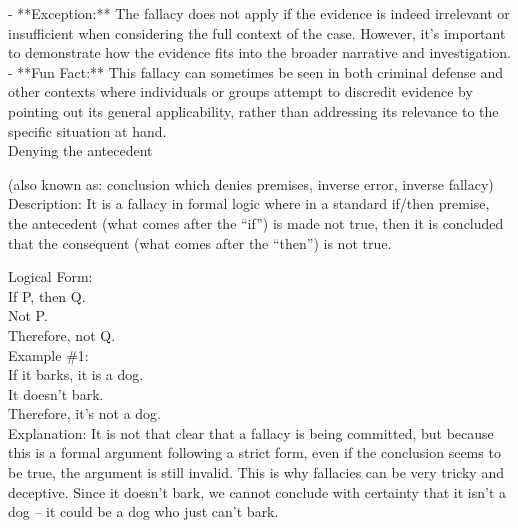 \documentclass[a4paper,12pt,single,pdftex]{scrbook}
\begin{document}
    
      - **Exception:** The fallacy does not apply if the evidence is indeed irrelevant or insufficient when considering the full context of the case. However, it’s important to demonstrate how the evidence fits into the broader narrative and investigation.
    \\

    
      - **Fun Fact:** This fallacy can sometimes be seen in both criminal defense and other contexts where individuals or groups attempt to discredit evidence by pointing out its general applicability, rather than addressing its relevance to the specific situation at hand.
    \\

  

Denying the antecedent
    
      (also known as: conclusion which denies premises, inverse error, inverse fallacy)
    \\

  
    Description: It is a fallacy in formal logic where in a standard if/then premise, the antecedent (what comes after the “if”) is made not true, then it is concluded that the consequent (what comes after the “then”) is not true.

    
      Logical Form:
    \\

    
      If P, then Q.
    \\

    
      Not P.
    \\

    
      Therefore, not Q.
    \\

    
      Example \#1:
    \\

    
      If it barks, it is a dog.
    \\

    
      It doesn’t bark.
    \\

    
      Therefore, it’s not a dog.
    \\

    
      Explanation: It is not that clear that a fallacy is being committed, but because this is a formal argument following a strict form, even if the conclusion seems to be true, the argument is still invalid.  This is why fallacies can be very tricky and deceptive.  Since it doesn’t bark, we cannot conclude with certainty that it isn’t a dog -- it could be a dog who just can’t bark.
    \\
\end{document}
